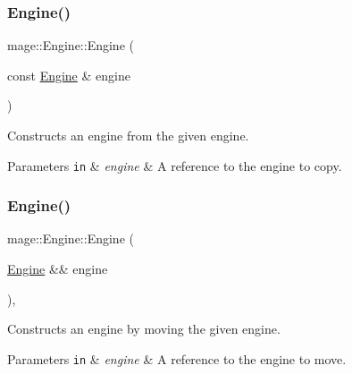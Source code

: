 \subsubsection{\texorpdfstring{Engine()}{Engine()}\hspace{0.1cm}{\footnotesize\ttfamily [2/3]}}
{\footnotesize\ttfamily mage\+::\+Engine\+::\+Engine (\begin{DoxyParamCaption}\item[{const \mbox{\hyperlink{classmage_1_1_engine}{Engine}} \&}]{engine }\end{DoxyParamCaption})\hspace{0.3cm}{\ttfamily [delete]}}

Constructs an engine from the given engine.


\begin{DoxyParams}[1]{Parameters}
\mbox{\tt in}  & {\em engine} & A reference to the engine to copy. \\
\hline
\end{DoxyParams}
\mbox{\label{classmage_1_1_engine_a91a51a60109b49d6e322c299147e1312}} 
\subsubsection{\texorpdfstring{Engine()}{Engine()}\hspace{0.1cm}{\footnotesize\ttfamily [3/3]}}
{\footnotesize\ttfamily mage\+::\+Engine\+::\+Engine (\begin{DoxyParamCaption}\item[{\mbox{\hyperlink{classmage_1_1_engine}{Engine}} \&\&}]{engine }\end{DoxyParamCaption})\hspace{0.3cm}{\ttfamily [default]}, {\ttfamily [noexcept]}}

Constructs an engine by moving the given engine.


\begin{DoxyParams}[1]{Parameters}
\mbox{\tt in}  & {\em engine} & A reference to the engine to move. \\
\hline
\end{DoxyParams}
\mbox{\label{classmage_1_1_engine_a34628556f8397d70ed018d71e343c2f5}} 
